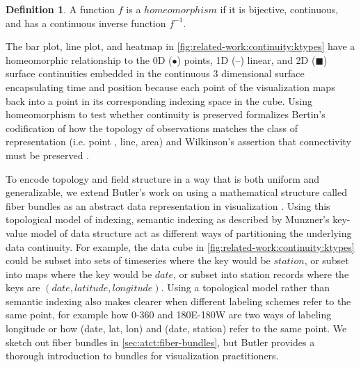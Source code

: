 \documentclass[journal]{IEEEtran}
\theoremstyle{definition}
\newtheorem{definition}{Definition}[section]
\theoremstyle{remark}
\begin{document}
\begin{definition}
  A function $f$ is a $homeomorphism$ if it is bijective, continuous, and has a continuous inverse function $f^{-1}$.
\end{definition}

The bar plot, line plot, and heatmap in \autoref{fig:related-work:continuity:ktypes} have a homeomorphic relationship to the 0D ($\bullet$) points, 1D (--) linear, and 2D ($\blacksquare$) surface continuities embedded in the continuous 3 dimensional surface encapsulating time and position because each point of the visualization maps back into a point in its corresponding indexing space in the cube. Using homeomorphism to test whether continuity is preserved formalizes Bertin's codification of how the topology of observations matches the class of representation (i.e. point , line, area) \cite{bertinSemiologyGraphicsDiagrams2011} and Wilkinson's assertion that connectivity must be preserved \cite{wilkinsonGrammarGraphics2005}.

To encode topology and field structure in a way that is both uniform and generalizable, we extend Butler's work on using a mathematical structure called fiber bundles as an abstract data representation in visualization \cite{butlerVectorBundleClassesForm1992, butlerVisualizationModelBased1989}. Using this topological model of indexing, semantic indexing as described by Munzner's key-value model of data structure \cite{munznerWhatDataAbstraction2014} act as different ways of partitioning the underlying data continuity. For example, the data cube in \autoref{fig:related-work:continuity:ktypes} could be subset into sets of timeseries where the key would be $station$, or subset into maps where the key would be $date$, or subset into station records where the keys are $(date, latitude, longitude)$. Using a topological model rather than semantic indexing also makes clearer when different labeling schemes refer to the same point, for example how 0-360 and 180E-180W are two ways of labeling longitude or how (date, lat, lon) and (date, station) refer to the same point. We sketch out fiber bundles in \autoref{sec:atct:fiber-bundles}, but Butler provides a thorough introduction to bundles for visualization practitioners.
\end{document}
